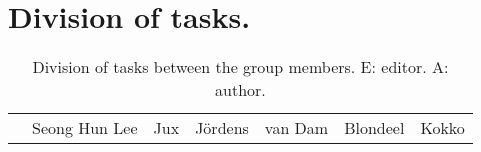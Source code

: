 





\maketitle
\tableofcontents



\chapter{Division of tasks.}

\begin{longtable}{rcccccc}
  \caption{Division of tasks between the group members. E: editor. A: author.} \\
  & Seong Hun Lee & Jux & Jördens & van Dam & Blondeel & Kokko \\
\end{longtable}




